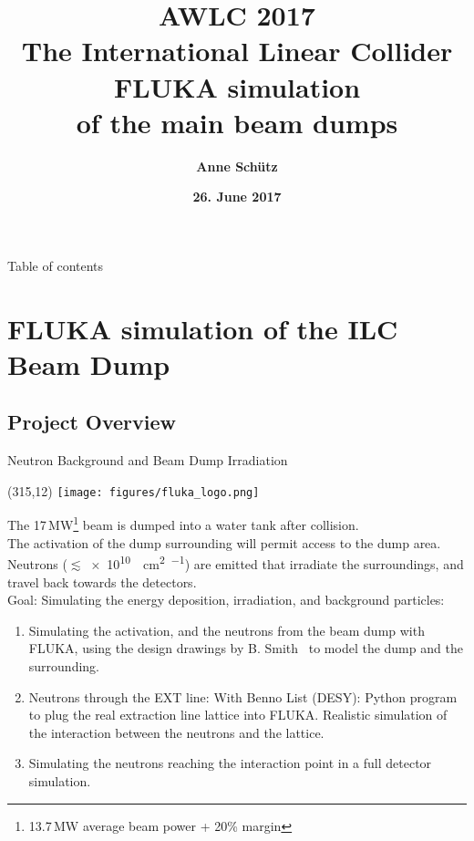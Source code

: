 \documentclass[xcolor={dvipsnames}]{beamer}
\title[Neutrons from the main beam dumps]{\textbf{\alert{AWLC 2017} \\ \vspace*{0.3cm} The International Linear Collider \\ \LARGE FLUKA simulation\\of the main beam dumps}}
\author{\textbf{Anne Sch\"utz}}
\institute{\textbf{DESY}}
\date{\textbf{26. June 2017}}
\newcommand{\flukalogo}{
  \setlength{\TPHorizModule}{1pt}
  \setlength{\TPVertModule}{1pt}
  \begin{textblock}{1}(315,12)
   \texttt{[image: figures/fluka\_logo.png]}
  \end{textblock}
}
\begin{document}
{
\begin{frame}
  \titlepage
\end{frame}
}

\begin{frame}{Table of contents}
  \tableofcontents
\end{frame}



\section{FLUKA simulation of the ILC Beam Dump}
\subsection{Project Overview}
{
\begin{frame}{Neutron Background and Beam Dump Irradiation}
\flukalogo
The 17\,MW\footnote{13.7\,MW average beam power + 20\% margin} beam is dumped into a water tank after collision.\\The activation of the dump surrounding will permit access to the dump area. Neutrons ($\lesssim$\SI{e10}{\per\square\centi\metre\per\year}) are emitted that irradiate the surroundings, and travel back towards the detectors.~\cite{SLAC_FLUKA}\\
\vspace*{0.1cm}
\alert{Goal: Simulating the energy deposition, irradiation, and background particles:}
\begin{enumerate}
 \item Simulating the activation, and the neutrons from the beam dump with FLUKA, using the design drawings by B. Smith~\cite{Smith} to model the dump and the surrounding.
 \item Neutrons through the EXT line: With Benno List (DESY): Python program to plug the real extraction line lattice into FLUKA. Realistic simulation of the interaction between the neutrons and the lattice.
 \item Simulating the neutrons reaching the interaction point in a full detector simulation.
\end{enumerate}
\end{frame}
}
\end{document}
